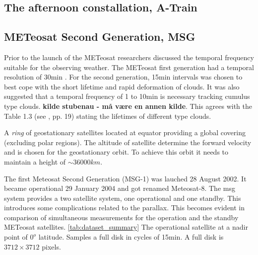 
\subsection{The afternoon constallation, A-Train}

\subsection{METeosat Second Generation, MSG} \label{sec:meteosat}
Prior to the launch of the METeosat researchers discussed the temporal frequency suitable for the observing weather. The METeosat first generation had a temporal resolution of 30min \cite{}. For the second generation, 15min intervals was chosen to best cope with the short lifetime and rapid deformation of clouds. It was also suggested that a temporal frequency of 1 to 10min is necessary tracking cumulus type clouds. \textbf{kilde stubenau - må være en annen kilde}. This agrees with the Table 1.3 (see \cite{lohmann2016}, pp. 19) stating the lifetimes of different type clouds. 

A \textit{ring} of geostationary satellites located at equator providing a global covering (excluding polar regions). The altitude of satellite determine the forward velocity and is chosen for the geostationary orbit. To achieve this orbit it needs to maintain a height of $\sim 36 000km $. 

The first Meteosat Second Generation (MSG-1) was lauched 28 August 2002. It became operational 29 January 2004 and got renamed Meteosat-8. The \acrshort{msg} system provides a two satellite system, one operational and one standby. This introduces some complications related to the parallax. This becomes evident in comparison of  simultaneous measurements for the operation and the standby METeosat satellites. \ref{tab:dataset_summary} The operational satellite at a nadir point of $0^o$ latitude. Samples a full disk in cycles of 15min. A full disk is $3712\times 3712$ pixels.

